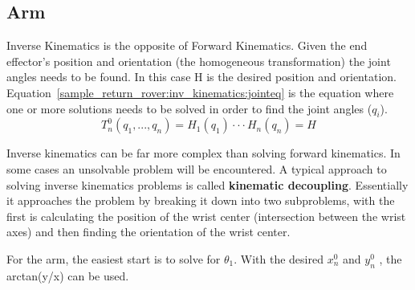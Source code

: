 \subsection{Arm}
Inverse Kinematics is the opposite of Forward Kinematics. Given the end effector's position and orientation (the homogeneous transformation) the joint angles needs to be found. In this case H is the desired position and orientation. Equation~\ref{sample_return_rover:inv_kinematics:jointeq} is the equation where one or more solutions needs to be solved in order to find the joint angles ($q_{i}$).
\begin{equation}
	T^{0}_{n}(q_{1},...,q_{n}) = H_{1}(q_{1})\cdot\cdot\cdot H_{n}(q_{n}) = H
	\label{sample_return_rover:inv_kinematics:jointeq} 
\end{equation}	

Inverse kinematics can be far more complex than solving forward kinematics. In some cases an unsolvable problem will be encountered. A typical approach to solving inverse kinematics problems is called \textbf{kinematic decoupling}. Essentially it approaches the problem by breaking it down into two subproblems, with the first is calculating the position of the wrist center (intersection between the wrist axes) and then finding the orientation of the wrist center.\cite{spong}

For the arm, the easiest start is to solve for $\theta_{1}$. With the desired $x^{0}_{n}$ and $y^{0}_{n}$ , the arctan(y/x) can be used.


